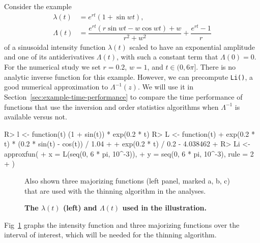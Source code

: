 \documentclass[10pt,letterpaper]{article}
\newcommand{\fct}[1]{\texttt{#1()}}
\begin{document}
Consider the example
\begin{equation}\label{eq:illustration}
\begin{aligned}
\lambda(t) &= e^{rt}(1+\sin wt), \\
\Lambda(t) &= \dfrac{e^{rt}(r\sin wt - w\cos wt) + w}{r^2+w^2}+\dfrac{e^{rt}-1}{r} %
\end{aligned}
\end{equation}
of a sinusoidal intensity function $\lambda(t)$ scaled to have an exponential amplitude and one of its antiderivatives $\Lambda(t)$, with such a constant term that $\Lambda(0)=0$.  For the numerical study we set $r=0.2$, $w=1$, and $t \in (0, 6\pi]$. There is no  analytic inverse function for this example.
However, we can precompute \fct{Li}, a good numerical approximation to $\Lambda^{-1}(z)$. We will use it in Section~\ref{sec:example-time-performance} to compare the time performance of functions that use the inversion and order statistics algorithms when $\Lambda^{-1}$ is available versus not.
\begin{Schunk}
\begin{Sinput}
R> l <- function(t) (1 + sin(t)) * exp(0.2 * t)
R> L <- function(t) {
+    exp(0.2 * t) * (0.2 * sin(t) - cos(t)) / 1.04 +
+      exp(0.2 * t) / 0.2 - 4.038462
+  }
R> Li <- approxfun(
+    x = L(seq(0, 6 * pi, 10^-3)),
+    y = seq(0, 6 * pi, 10^-3), rule = 2
+  )
\end{Sinput}
\end{Schunk}



\begin{Schunk}
\begin{figure}

\caption[The $\lambda(t)$ (left) and $\Lambda(t)$ used in the illustration]{{\bf The $\lambda(t)$ (left) and $\Lambda(t)$ used in the illustration.}}\label{fig:example-function-plot}
%\texttt{[image: figure/example-function-plot-1]} 
\begin{flushleft}
Also shown three majorizing functions (left panel, marked a, b, c) that are used with the thinning algorithm in the analyses.
\end{flushleft}
\end{figure}
\end{Schunk}

Fig~\ref{fig:example-function-plot} graphs the intensity function and three majorizing functions over the interval of interest, which will be needed for the thinning algorithm.
\end{document}
